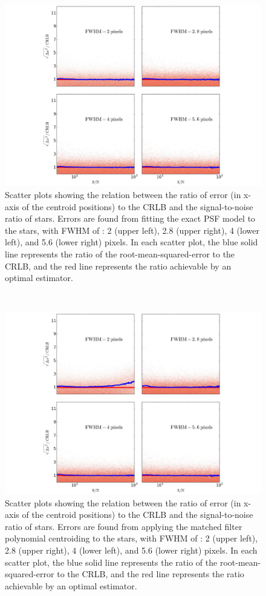 \documentclass[onecolumn]{aastex61}
\newcommand{\todo}[1]{{\textcolor{dred}{ #1}}}
\begin{document}
\begin{figure}[p]~\\
\begin{center}
\includegraphics[width=0.85\linewidth]{new_psf.pdf}
\caption{\todo{Scatter plots showing the relation between the ratio of error (in x-axis of the centroid positions) to the CRLB and the signal-to-noise ratio of stars. 
Errors are found from fitting the exact PSF model to the stars,
with FWHM of : 2 (upper left), 2.8 (upper right), 4 (lower left), and 5.6 (lower right)
pixels. In each scatter plot, the blue solid line represents the ratio of the root-mean-squared-error to the CRLB, and the red line represents the ratio achievable by an optimal estimator.}}\label{1}
\end{center}
\end{figure}

\begin{figure}[p]~\\
\begin{center}
 \includegraphics[width=0.85\linewidth]{new_matchedfilter.pdf}
 \caption{\todo{Scatter plots showing the relation between the ratio of error (in x-axis of the centroid positions) to the CRLB and the signal-to-noise ratio of stars. 
Errors are found from applying the matched filter polynomial centroiding to the stars,
with FWHM of : 2 (upper left), 2.8 (upper right), 4 (lower left), and 5.6 (lower right) pixels. In each scatter plot, the blue solid line represents the ratio of the root-mean-squared-error to the CRLB, and the red line represents the ratio achievable by an optimal estimator.}}\label{2}
\end{center}
\end{figure}
\end{document}
